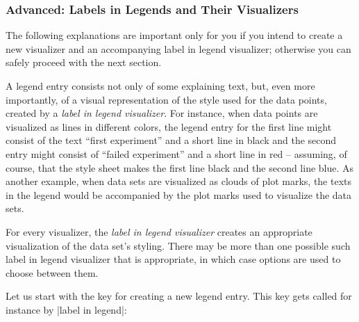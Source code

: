 \subsubsection{Advanced: Labels in Legends and Their Visualizers}
\label{section-dv-legend-entries}

The following explanations are important only for you if you intend to create a
new visualizer and an accompanying label in legend visualizer; otherwise you
can safely proceed with the next section.

A legend entry consists not only of some explaining text, but, even more
importantly, of a visual representation of the style used for the data points,
created by a \emph{label in legend visualizer}. For instance, when data points
are visualized as lines in different colors, the legend entry for the first
line might consist of the text ``first experiment'' and a short line in black
and the second entry might consist of ``failed experiment'' and a short line in
red -- assuming, of course, that the style sheet makes the first line black and
the second line blue. As another example, when data sets are visualized as
clouds of plot marks, the texts in the legend would be accompanied by the plot
marks used to visualize the data sets.

For every visualizer, the \emph{label in legend visualizer} creates an
appropriate visualization of the data set's styling. There may be more than one
possible such label in legend visualizer that is appropriate, in which case
options are used to choose between them.

Let us start with the key for creating a new legend entry. This key gets called
for instance by |label in legend|:

